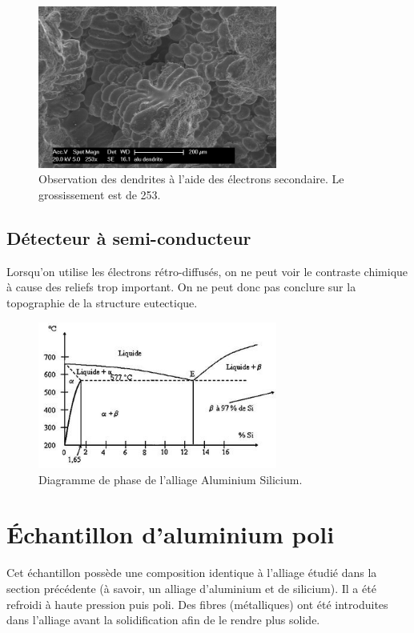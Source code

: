 \documentclass[a4paper,12pt]{article}
\begin{document}
\begin{figure}[h!]
\centering
\includegraphics[width=0.7\textwidth]{images/alu_dendrites.png}
\caption{Observation des dendrites à l'aide des électrons secondaire. Le grossissement est de 253.}
\label{fig:dendrites}
\end{figure}

\subsection{Détecteur à semi-conducteur}

Lorsqu'on utilise les électrons rétro-diffusés, on ne peut voir le contraste chimique à cause des reliefs trop important. On ne peut donc pas conclure sur la topographie de la structure eutectique. 

\begin{figure}[h]
\centering
\includegraphics[width=0.7\textwidth]{images/diagphasealusi.jpg}
\caption{Diagramme de phase de l'alliage Aluminium Silicium.}
\label{fig:diagphase}
\end{figure}


\section{Échantillon d'aluminium poli}

Cet échantillon possède une composition identique à l'alliage étudié dans la section précédente (à savoir, un alliage d'aluminium et de silicium). 
Il a été refroidi à haute pression puis poli.
Des fibres (métalliques) ont été introduites dans l'alliage avant la solidification afin de le rendre plus solide.
\end{document}
